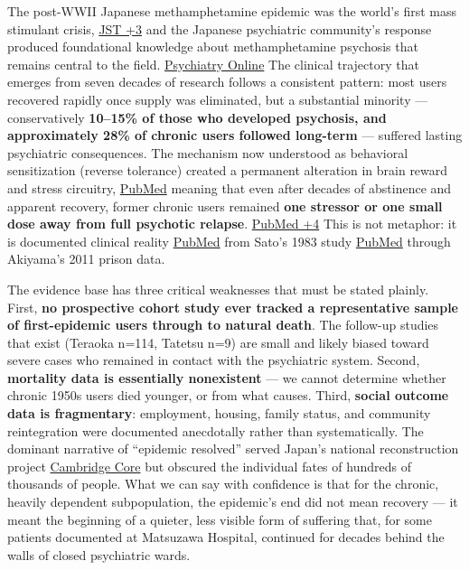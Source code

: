 The post-WWII Japanese methamphetamine epidemic was the world's first mass stimulant crisis, \href{https://www.jstage.jst.go.jp/article/faruawpsj/57/2/57_139/_pdf/-char/ja}{JST +3} and the Japanese psychiatric community's response produced foundational knowledge about methamphetamine psychosis that remains central to the field. \href{https://psychiatryonline.org/doi/10.1176/appi.ajp.2009.08111695}{Psychiatry Online} The clinical trajectory that emerges from seven decades of research follows a consistent pattern: most users recovered rapidly once supply was eliminated, but a substantial minority --- conservatively \textbf{10--15\% of those who developed psychosis, and approximately 28\% of chronic users followed long-term} --- suffered lasting psychiatric consequences. The mechanism now understood as behavioral sensitization (reverse tolerance) created a permanent alteration in brain reward and stress circuitry, \href{https://pubmed.ncbi.nlm.nih.gov/15542728/?dopt=Abstract}{PubMed} meaning that even after decades of abstinence and apparent recovery, former chronic users remained \textbf{one stressor or one small dose away from full psychotic relapse}. \href{https://pubmed.ncbi.nlm.nih.gov/11085329/}{PubMed +4} This is not metaphor: it is documented clinical reality \href{https://pubmed.ncbi.nlm.nih.gov/15542728/?dopt=Abstract}{PubMed} from Sato's 1983 study \href{https://pubmed.ncbi.nlm.nih.gov/6860719/}{PubMed} through Akiyama's 2011 prison data.

The evidence base has three critical weaknesses that must be stated plainly. First, \textbf{no prospective cohort study ever tracked a representative sample of first-epidemic users through to natural death}. The follow-up studies that exist (Teraoka n=114, Tatetsu n=9) are small and likely biased toward severe cases who remained in contact with the psychiatric system. Second, \textbf{mortality data is essentially nonexistent} --- we cannot determine whether chronic 1950s users died younger, or from what causes. Third, \textbf{social outcome data is fragmentary}: employment, housing, family status, and community reintegration were documented anecdotally rather than systematically. The dominant narrative of ``epidemic resolved'' served Japan's national reconstruction project \href{https://www.cambridge.org/core/journals/journal-of-asian-studies/article/abs/methamphetamine-solution-drugs-and-the-reconstruction-of-nation-in-postwar-japan/0A0FCE7E74AE7D1ECE9A134114773CE6}{Cambridge Core} but obscured the individual fates of hundreds of thousands of people. What we can say with confidence is that for the chronic, heavily dependent subpopulation, the epidemic's end did not mean recovery --- it meant the beginning of a quieter, less visible form of suffering that, for some patients documented at Matsuzawa Hospital, continued for decades behind the walls of closed psychiatric wards.
